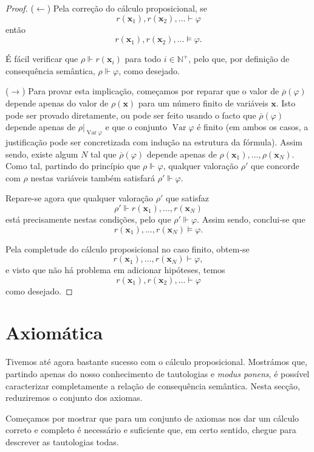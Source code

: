 \documentclass{report}
\theoremstyle{definition}
\theoremstyle{remark}
\newcommand{\N}{\mathbb{N}}
\renewcommand{\bf}[1]{\mathbf{#1}}
\DeclareMathOperator{\var}{Var}
\begin{document}
	\begin{proof}
	($\leftarrow$) Pela correção do cálculo proposicional, se
	\[r(\bf x_1), r(\bf x_2), \dots \vdash \varphi\]
	então
	\[r(\bf x_1), r(\bf x_2), \dots \vDash \varphi.\]
	
	É fácil verificar que $\rho \Vdash r(\bf x_i)$ para todo $i \in \N^+$, pelo que, por definição de consequência semântica, $\rho \Vdash \varphi$, como desejado.
	
	\medskip
	
	($\rightarrow$) Para provar esta implicação, começamos por reparar que o valor de $\overline\rho(\varphi)$ depende apenas do valor de $\rho(\bf x)$ para um número finito de variáveis $\bf x$. Isto pode ser provado diretamente, ou pode ser feito usando o facto que $\overline\rho(\varphi)$ depende apenas de $\rho|_{\var \varphi}$ e que o conjunto $\var \varphi$ é finito (em ambos os casos, a justificação pode ser concretizada com indução na estrutura da fórmula). Assim sendo, existe algum $N$ tal que $\overline\rho(\varphi)$ depende apenas de $\rho(\bf x_1), \dots, \rho(\bf x_N)$. Como tal, partindo do princípio que $\rho \Vdash \varphi$, qualquer valoração $\rho'$ que concorde com $\rho$ nestas variáveis também satisfará $\rho' \Vdash \varphi$.
	
	Repare-se agora que qualquer valoração $\rho'$ que satisfaz
	\[\rho' \Vdash r(\bf x_1), \dots, r(\bf x_N)\]
	está precisamente nestas condições, pelo que $\rho' \Vdash \varphi$. Assim sendo, conclui-se que
	\[r(\bf x_1), \dots, r(\bf x_N) \vDash \varphi.\]
	
	Pela completude do cálculo proposicional no caso finito, obtem-se
	\[r(\bf x_1), \dots, r(\bf x_N) \vdash \varphi,\]
	e visto que não há problema em adicionar hipóteses, temos
	\[r(\bf x_1), r(\bf x_2), \dots \vdash \varphi\]
	como desejado.
	\end{proof}
	
	\section{Axiomática}
	
	Tivemos até agora bastante sucesso com o cálculo proposicional. Mostrámos que, partindo apenas do nosso conhecimento de tautologias e \textit{modus ponens}, é possível caracterizar completamente a relação de consequência semântica. Nesta secção, reduziremos o conjunto dos axiomas.
	
	Começamos por mostrar que para um conjunto de axiomas nos dar um cálculo correto e completo é necessário e suficiente que, em certo sentido, chegue para descrever as tautologias todas.
	
\end{document}
